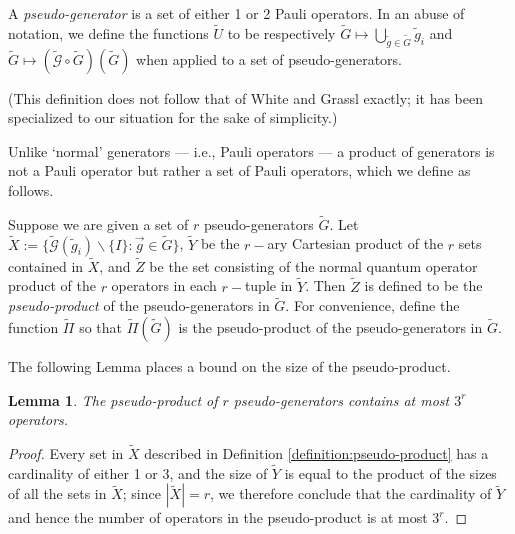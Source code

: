 \documentclass[twocolumn,showpacs,preprintnumbers,amsmath,amssymb,nofootinbib,pra,floatfix]{revtex4-1}
\newtheorem{lemma}{Lemma}
\newenvironment{definition}[1][Definition]{\begin{trivlist}
\item[\hskip \labelsep {\bfseries #1}]}{\end{trivlist}}
\newenvironment{remark}[1][Remark]{\begin{trivlist}
\item[\hskip \labelsep {\bfseries #1}]}{\end{trivlist}}
\newcommand{\lst}{\vec}
\newcommand{\set}{\tilde}
\newcommand{\genfun}{\tilde{\mathcal{G}}}
\newcommand{\pseudoproduct}{\set\Pi}
\begin{document}
\begin{definition}
A \emph{pseudo-generator} is a set of either 1 or 2 Pauli operators.  In an abuse of notation, we define the functions $\set U$ to be respectively $\set G\mapsto \bigcup_{\set g\in\set G} \set g_i$ and $\set G\mapsto (\genfun\circ\set G)(\set G)$ when applied to a set of pseudo-generators.
\end{definition}
\begin{remark}
(This definition does not follow that of White and Grassl exactly; it has been specialized to our situation for the sake of simplicity.)

Unlike `normal' generators --- i.e., Pauli operators --- a product of generators is not a Pauli operator but rather a set of Pauli operators, which we define as follows.
\end{remark}

\begin{definition}
\label{definition:pseudo-product}
Suppose we are given a set of $r$ pseudo-generators $\set G$.  Let $\set X:=\{\genfun(\set g_i)\backslash\{I\}: \lst g\in\set G\}$, $\set Y$ be the $r-$ary Cartesian product of the $r$ sets contained in $\set X$, and $\set Z$ be the set consisting of the normal quantum operator product of the $r$ operators in each $r-$tuple in $\set Y$.  Then $\set Z$ is defined to be the \emph{pseudo-product} of the pseudo-generators in $\set G$.  For convenience, define the function $\pseudoproduct$ so that $\pseudoproduct(\set G)$ is the pseudo-product of the pseudo-generators in $\set G$.
\end{definition}

\begin{remark}
The following Lemma places a bound on the size of the pseudo-product.
\end{remark}

\begin{lemma}
\label{lemma:bound-on-pseudo-product}
The pseudo-product of $r$ pseudo-generators contains at most $3^r$ operators.
\end{lemma}

\begin{proof}
Every set in $\set X$ described in Definition \ref{definition:pseudo-product} has a cardinality of either 1 or 3, and the size of $\set Y$ is equal to the product of the sizes of all the sets in $\set X$;  since $|\set X|=r$, we therefore conclude that the cardinality of $\set Y$ and hence the number of operators in the pseudo-product is at most $3^r$.
\end{proof}
\end{document}
